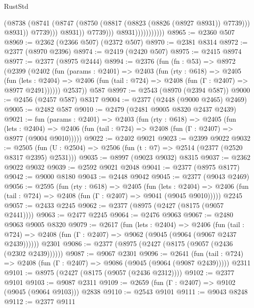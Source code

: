 \begin{lexlean}{RustStd}
\begin{coremodule}
                                        (@8738
                                          (@8741
                                            (@8747
                                              (@8750 (@8817 (@8823 (@8826 (@8927 @8931)) @7739)))
                                              @8931))
                                          @7739)))
                                    @8931))
                                @7739)))
                          @8931)))))))))))
@8965 := @2360 @507
@8969 := @2362 (@2366 @507) (@2372 @507)
@8970 := @2381 @8314
@8972 := @2377 (@8970 @2396)
@8974 := @2419 (@2420 @507)
@8975 := @2415 @8974
@8977 := @2377 (@8975 @2444)
@8994 := @2376
    (fun (fn : @53) =>
    @8972
      (@2399
        (@2402
          (fun (params : @2401) =>
          @2403
            (fun (rty : @618) =>
            @2405
              (fun (lets : @2404) =>
              @2406 (fun (tail : @724) => @2408 (fun (Γ : @2407) => @8977 @2491))))))
        @2537))
    @587
@8997 := @2543 (@8970 (@2394 @587))
@9000 := @2456 (@2457 @587) @8317
@9004 := @2377 (@2448 (@9000 @2465) @2469)
@9005 := @2482 @587
@9010 := @2479 (@2481 @9005 @8320 @2437 @2439)
@9021 := fun (params : @2401) =>
  @2403
    (fun (rty : @618) =>
    @2405
      (fun (lets : @2404) =>
      @2406 (fun (tail : @724) => @2408 (fun (Γ : @2407) => @8977 (@9004 @9010)))))
@9022 := @2402 @9021
@9023 := @2399 @9022
@9032 := @2505 (fun (U : @2504) => @2506 (fun (t : @7) => @2514 (@2377 (@2520 @8317 @2395) @2531)))
@9035 := @8997 (@9023 @9032) @8315
@9037 := @2362 @9022 @9032
@9039 := @2592 @9021 @2048
@9041 := @2377 (@8975 @8177)
@9042 := @9000 @8180
@9043 := @2448 @9042
@9045 := @2377 (@9043 @2469)
@9056 := @2595
    (fun (rty : @618) =>
    @2405
      (fun (lets : @2404) =>
      @2406 (fun (tail : @724) => @2408 (fun (Γ : @2407) => @9041 (@9045 @9010)))))
    @2245
@9057 := @2433 @2245
@9062 := @2377 (@8975 (@2427 (@8175 (@9057 @2441))))
@9063 := @2477 @2245
@9064 := @2476 @9063
@9067 := @2480 @9063 @9005 @8320
@9079 := @2617
    (fun (lets : @2404) =>
    @2406
      (fun (tail : @724) => @2408 (fun (Γ : @2407) => @9062 (@9045 (@9064 (@9067 @2437 @2439))))))
    @2301
@9086 := @2377 (@8975 (@2427 (@8175 (@9057 (@2436 (@2302 @2439))))))
@9087 := @9067 @2301
@9096 := @2641
    (fun (tail : @724) => @2408 (fun (Γ : @2407) => @9086 (@9045 (@9064 (@9087 @2439)))))
    @2311
@9101 := @8975 (@2427 (@8175 (@9057 (@2436 @2312))))
@9102 := @2377 @9101
@9103 := @9087 @2311
@9109 := @2659 (fun (Γ : @2407) => @9102 (@9045 (@9064 @9103))) @2838
@9110 := @2543 @9101
@9111 := @9043 @8248
@9112 := @2377 @9111

\end{coremodule}
\end{lexlean}
